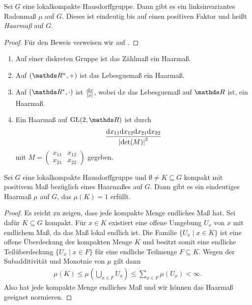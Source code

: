 \begin{thm}[Haar]
Sei $G$ eine lokalkompakte Hausdorffgruppe.
Dann gibt es ein linksinvariantes Radonmaß $\mu$ auf $G$.
Dieses ist eindeutig bis auf einen positiven Faktor und heißt \emph{Haarmaß} auf $G$.
\end{thm}
\begin{proof}
Für den Beweis verweisen wir auf \cite[VII, 3.12]{Elstrodt}.
\end{proof}

\begin{bsp}
\begin{enumerate}[label=\roman*)]
\item Auf einer diskreten Gruppe ist das Zählmaß ein Haarmaß.
\item Auf $(\Rn,+)$ ist das Lebesguemaß ein Haarmaß.
\item Auf $(\R^\ast,\cdot)$ ist $\frac{\mathrm{d}x}{\left\vert x\right\vert}$, wobei $\mathrm{d}x$ das Lebesguemaß auf $\R$ ist, ein Haarmaß.
\item Ein Haarmaß auf $\GL(2,\R)$ ist durch
\begin{align*}
\frac{\mathrm{d}x_{11}\mathrm{d}x_{12}\mathrm{d}x_{21}\mathrm{d}x_{22}}{\left\vert\det(M)\right\vert^2}
\end{align*}
mit $M=\begin{pmatrix}
x_{11} &x_{12}\\
x_{21} &x_{22}
\end{pmatrix}$
gegeben.
\end{enumerate}
\end{bsp}

\begin{thm}
Sei $G$ eine lokalkompakte Hausdorffgruppe und $\emptyset \not =K\subseteq G$ kompakt mit positivem Maß bezüglich eines Haarmaßes auf $G$. Dann gibt es ein eindeutiges Haarmaß $\mu$ auf $G$, das $\mu(K)=1$ erfüllt.
\end{thm}
\begin{proof}
Es reicht zu zeigen, dass jede kompakte Menge endliches Maß hat.
Sei dafür $K \subseteq G$ kompakt.
Für $x \in K$ existiert eine offene Umgebung $U_x$ von $x$ mit endlichem Maß, da das Maß lokal endlich ist.
Die Familie $\{U_x \mid x\in K\}$ ist eine offene Überdeckung der kompakten Menge $K$ und besitzt somit eine endliche Teilüberdeckung
$\{U_x \mid x\in F\}$ für eine endliche Teilmenge $F\subseteq K$.
Wegen der Subadditivität und Monotnie von $\mu$ gilt dann
\begin{align*}
\mu(K)\leq \mu\left(\bigcup_{x\in F} U_x\right) \leq \sum_{x\in F} \mu(U_x)<\infty.
\end{align*}
Also hat jede kompakte Menge endliches Maß und wir können das Haarmaß geeignet normieren.
\end{proof}


